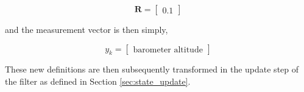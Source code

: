 \documentclass{article}
\begin{document}
\begin{equation}
   \mathbf{R} = \begin{bmatrix}
       0.1
   \end{bmatrix}
\end{equation}


and the measurement vector is then simply, 

\begin{equation}
    y_k =
\begin{bmatrix}
\text{barometer altitude} 
\end{bmatrix}
\end{equation}

These new definitions are then subsequently transformed in the update step of the filter as defined in Section \ref{sec:state_update}. 
\end{document}
